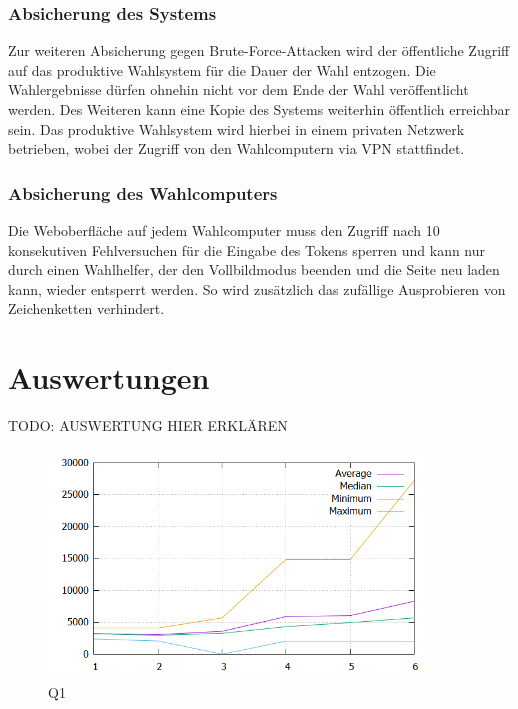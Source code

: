 \documentclass[a4paper]{scrreprt}
\begin{document}
\subsubsection{Absicherung des Systems}

Zur weiteren Absicherung gegen Brute-Force-Attacken wird der öffentliche Zugriff auf das produktive Wahlsystem für die Dauer der Wahl entzogen. Die Wahlergebnisse dürfen ohnehin nicht vor dem Ende der Wahl veröffentlicht werden. Des Weiteren kann eine Kopie des Systems weiterhin öffentlich erreichbar sein. Das produktive Wahlsystem wird hierbei in einem privaten Netzwerk betrieben, wobei der Zugriff von den Wahlcomputern via VPN stattfindet.

\subsubsection{Absicherung des Wahlcomputers}

Die Weboberfläche auf jedem Wahlcomputer muss den Zugriff nach 10 konsekutiven Fehlversuchen für die Eingabe des Tokens sperren und kann nur durch einen Wahlhelfer, der den Vollbildmodus beenden und die Seite neu laden kann, wieder entsperrt werden.
So wird zusätzlich das zufällige Ausprobieren von Zeichenketten verhindert.

\section{Auswertungen}

TODO: AUSWERTUNG HIER ERKLÄREN

\begin{figure}[h]
\centering
\includegraphics[width=0.9\textwidth]{images/q1-plot.png}
\caption {Q1}
\end{figure}
\end{document}
